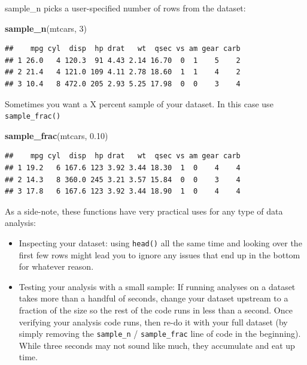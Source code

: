 \documentclass[]{book}
\newenvironment{Shaded}{\begin{snugshade}}{\end{snugshade}}
\newcommand{\KeywordTok}[1]{\textcolor[rgb]{0.13,0.29,0.53}{\textbf{#1}}}
\newcommand{\DecValTok}[1]{\textcolor[rgb]{0.00,0.00,0.81}{#1}}
\newcommand{\FloatTok}[1]{\textcolor[rgb]{0.00,0.00,0.81}{#1}}
\newcommand{\NormalTok}[1]{#1}
\providecommand{\tightlist}{%
  \setlength{\itemsep}{0pt}\setlength{\parskip}{0pt}}
\theoremstyle{definition}
\theoremstyle{definition}
\theoremstyle{definition}
\theoremstyle{remark}
\begin{document}
sample\_n picks a user-specified number of rows from the dataset:

\begin{Shaded}
\begin{Highlighting}[]
\KeywordTok{sample_n}\NormalTok{(mtcars, }\DecValTok{3}\NormalTok{)}
\end{Highlighting}
\end{Shaded}

\begin{verbatim}
##    mpg cyl  disp  hp drat   wt  qsec vs am gear carb
## 1 26.0   4 120.3  91 4.43 2.14 16.70  0  1    5    2
## 2 21.4   4 121.0 109 4.11 2.78 18.60  1  1    4    2
## 3 10.4   8 472.0 205 2.93 5.25 17.98  0  0    3    4
\end{verbatim}

Sometimes you want a X percent sample of your dataset. In this case use
\texttt{sample\_frac()}

\begin{Shaded}
\begin{Highlighting}[]
\KeywordTok{sample_frac}\NormalTok{(mtcars, }\FloatTok{0.10}\NormalTok{)}
\end{Highlighting}
\end{Shaded}

\begin{verbatim}
##    mpg cyl  disp  hp drat   wt  qsec vs am gear carb
## 1 19.2   6 167.6 123 3.92 3.44 18.30  1  0    4    4
## 2 14.3   8 360.0 245 3.21 3.57 15.84  0  0    3    4
## 3 17.8   6 167.6 123 3.92 3.44 18.90  1  0    4    4
\end{verbatim}

As a side-note, these functions have very practical uses for any type of
data analysis:

\begin{itemize}
\tightlist
\item
  Inspecting your dataset: using \texttt{head()} all the same time and
  looking over the first few rows might lead you to ignore any issues
  that end up in the bottom for whatever reason.
\item
  Testing your analysis with a small sample: If running analyses on a
  dataset takes more than a handful of seconds, change your dataset
  upstream to a fraction of the size so the rest of the code runs in
  less than a second. Once verifying your analysis code runs, then re-do
  it with your full dataset (by simply removing the \texttt{sample\_n} /
  \texttt{sample\_frac} line of code in the beginning). While three
  seconds may not sound like much, they accumulate and eat up time.
\end{itemize}
\end{document}
